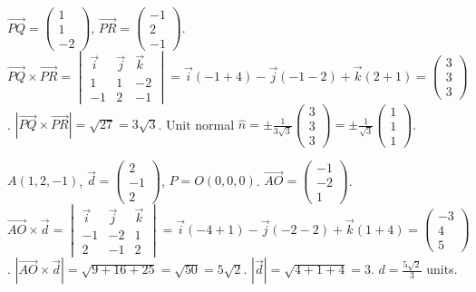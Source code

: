 \documentclass[11pt]{article}
\begin{document}
\begin{corrige}[Exercise 4]
$\vec{PQ} = \begin{pmatrix}1\\1\\-2\end{pmatrix}$, $\vec{PR} = \begin{pmatrix}-1\\2\\-1\end{pmatrix}$.
$\vec{PQ}\times\vec{PR} = \begin{vmatrix}\vec{i}&\vec{j}&\vec{k}\\1&1&-2\\-1&2&-1\end{vmatrix} = \vec{i}(-1+4) - \vec{j}(-1-2) + \vec{k}(2+1) = \begin{pmatrix}3\\3\\3\end{pmatrix}$.
$|\vec{PQ}\times\vec{PR}| = \sqrt{27} = 3\sqrt{3}$.
Unit normal $\hat{n} = \pm \frac{1}{3\sqrt{3}}\begin{pmatrix}3\\3\\3\end{pmatrix} = \pm \frac{1}{\sqrt{3}}\begin{pmatrix}1\\1\\1\end{pmatrix}$.
\end{corrige}

\begin{corrige}[Exercise 5]
$A(1,2,-1)$, $\vec{d} = \begin{pmatrix}2\\-1\\2\end{pmatrix}$, $P = O(0,0,0)$.
$\vec{AO} = \begin{pmatrix}-1\\-2\\1\end{pmatrix}$.
$\vec{AO}\times\vec{d} = \begin{vmatrix}\vec{i}&\vec{j}&\vec{k}\\-1&-2&1\\2&-1&2\end{vmatrix} = \vec{i}(-4+1) - \vec{j}(-2-2) + \vec{k}(1+4) = \begin{pmatrix}-3\\4\\5\end{pmatrix}$.
$|\vec{AO}\times\vec{d}| = \sqrt{9+16+25} = \sqrt{50} = 5\sqrt{2}$.
$|\vec{d}| = \sqrt{4+1+4} = 3$.
$d = \frac{5\sqrt{2}}{3}$ units.
\end{corrige}
\end{document}
